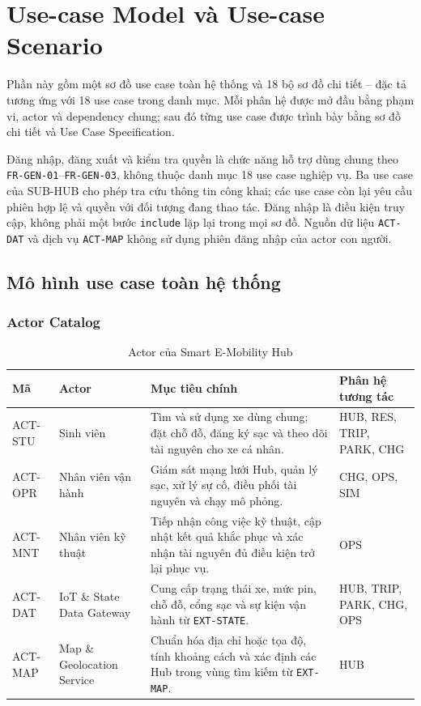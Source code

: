 \clearpage
\section{Use-case Model và Use-case Scenario}

Phần này gồm một sơ đồ use case toàn hệ thống và 18 bộ sơ đồ chi tiết -- đặc tả tương ứng với 18 use case trong danh mục. Mỗi phân hệ được mở đầu bằng phạm vi, actor và dependency chung; sau đó từng use case được trình bày bằng sơ đồ chi tiết và Use Case Specification.

Đăng nhập, đăng xuất và kiểm tra quyền là chức năng hỗ trợ dùng chung theo \texttt{FR-GEN-01}--\texttt{FR-GEN-03}, không thuộc danh mục 18 use case nghiệp vụ. Ba use case của SUB-HUB cho phép tra cứu thông tin công khai; các use case còn lại yêu cầu phiên hợp lệ và quyền với đối tượng đang thao tác. Đăng nhập là điều kiện truy cập, không phải một bước \texttt{include} lặp lại trong mọi sơ đồ. Nguồn dữ liệu \texttt{ACT-DAT} và dịch vụ \texttt{ACT-MAP} không sử dụng phiên đăng nhập của actor con người.

\subsection{Mô hình use case toàn hệ thống}

\subsubsection{Actor Catalog}

\begin{table}[htbp]
  \centering
  \caption{Actor của Smart E-Mobility Hub}
  \label{tab:actors}
  \begin{tabularx}{\textwidth}{|L{22mm}|L{34mm}|Y|L{40mm}|}
    \hline
    \textbf{Mã} & \centering\arraybackslash\textbf{Actor} & \centering\arraybackslash\textbf{Mục tiêu chính} & \centering\arraybackslash\textbf{Phân hệ tương tác}\\
    \hline
    ACT-STU & Sinh viên & Tìm và sử dụng xe dùng chung; đặt chỗ đỗ, đăng ký sạc và theo dõi tài nguyên cho xe cá nhân. & HUB, RES, TRIP, PARK, CHG\\\hline
    ACT-OPR & Nhân viên vận hành & Giám sát mạng lưới Hub, quản lý sạc, xử lý sự cố, điều phối tài nguyên và chạy mô phỏng. & CHG, OPS, SIM\\\hline
    ACT-MNT & Nhân viên kỹ thuật & Tiếp nhận công việc kỹ thuật, cập nhật kết quả khắc phục và xác nhận tài nguyên đủ điều kiện trở lại phục vụ. & OPS\\\hline
    ACT-DAT & IoT \& State Data Gateway & Cung cấp trạng thái xe, mức pin, chỗ đỗ, cổng sạc và sự kiện vận hành từ \texttt{EXT-STATE}. & HUB, TRIP, PARK, CHG, OPS\\\hline
    ACT-MAP & Map \& Geolocation Service & Chuẩn hóa địa chỉ hoặc tọa độ, tính khoảng cách và xác định các Hub trong vùng tìm kiếm từ \texttt{EXT-MAP}. & HUB\\\hline
  \end{tabularx}
\end{table}

